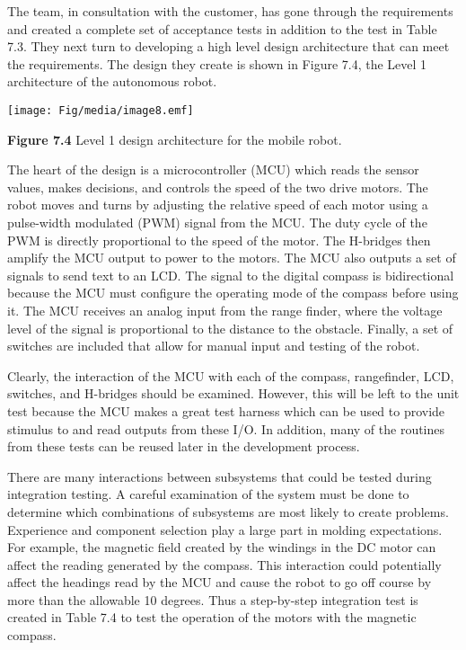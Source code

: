 The team, in consultation with the customer, has gone through the
requirements and created a complete set of acceptance tests in addition
to the test in Table 7.3. They next turn to developing a high level
design architecture that can meet the requirements. The design they
create is shown in Figure 7.4, the Level 1 architecture of the
autonomous robot.

\texttt{[image: Fig/media/image8.emf]}

\textbf{Figure 7.4} Level 1 design architecture for the mobile robot.

The heart of the design is a microcontroller (MCU) which reads the
sensor values, makes decisions, and controls the speed of the two drive
motors. The robot moves and turns by adjusting the relative speed of
each motor using a pulse-width modulated (PWM) signal from the MCU. The
duty cycle of the PWM is directly proportional to the speed of the
motor. The H-bridges then amplify the MCU output to power to the motors.
The MCU also outputs a set of signals to send text to an LCD. The signal
to the digital compass is bidirectional because the MCU must configure
the operating mode of the compass before using it. The MCU receives an
analog input from the range finder, where the voltage level of the
signal is proportional to the distance to the obstacle. Finally, a set
of switches are included that allow for manual input and testing of the
robot.

Clearly, the interaction of the MCU with each of the compass,
rangefinder, LCD, switches, and H-bridges should be examined. However,
this will be left to the unit test because the MCU makes a great test
harness which can be used to provide stimulus to and read outputs from
these I/O. In addition, many of the routines from these tests can be
reused later in the development process.

There are many interactions between subsystems that could be tested
during integration testing. A careful examination of the system must be
done to determine which combinations of subsystems are most likely to
create problems. Experience and component selection play a large part in
molding expectations. For example, the magnetic field created by the
windings in the DC motor can affect the reading generated by the
compass. This interaction could potentially affect the headings read by
the MCU and cause the robot to go off course by more than the allowable
10 degrees. Thus a step-by-step integration test is created in Table 7.4
to test the operation of the motors with the magnetic compass.

